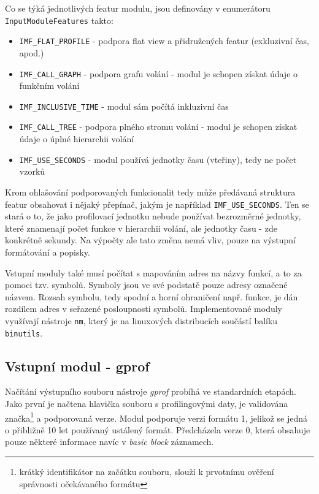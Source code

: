 \documentclass[czech,BP]{thesiskiv}
\begin{document}
Co se týká jednotlivých featur modulu, jsou definovány v enumerátoru \texttt{InputModuleFeatures} takto:

\begin{itemize}
\item \texttt{IMF\_FLAT\_PROFILE} - podpora flat view a přidružených featur (exkluzivní čas, apod.)
\item \texttt{IMF\_CALL\_GRAPH} - podpora grafu volání - modul je schopen získat údaje o funkčním volání
\item \texttt{IMF\_INCLUSIVE\_TIME} - modul sám počítá inkluzivní čas
\item \texttt{IMF\_CALL\_TREE} - podpora plného stromu volání - modul je schopen získat údaje o úplné hierarchii volání
\item \texttt{IMF\_USE\_SECONDS} - modul používá jednotky času (vteřiny), tedy ne počet vzorků
\end{itemize}

Krom ohlašování podporovaných funkcionalit tedy může předávaná struktura featur obsahovat i nějaký přepínač, jakým je například \texttt{IMF\_USE\_SECONDS}. Ten se stará o to, že jako profilovací jednotku nebude používat bezrozměrné jednotky, které znamenají počet  funkce v hierarchii volání, ale jednotky času - zde konkrétně sekundy. Na výpočty ale tato změna nemá vliv, pouze na výstupní formátování a popisky.

Vstupní moduly také musí počítat s mapováním adres na názvy funkcí, a to za pomoci tzv. symbolů. Symboly jsou ve své podstatě pouze adresy označené názvem. Rozsah symbolu, tedy spodní a horní ohraničení např. funkce, je dán rozdílem adres v seřazené posloupnosti symbolů. Implementované moduly využívají nástroje \texttt{nm}, který je na linuxových distribucích součástí balíku \texttt{binutils}.

\subsection{Vstupní modul - gprof}

Načítání výstupního souboru nástroje \emph{gprof} probíhá ve standardních etapách. Jako první je načtena hlavička souboru s profilingovými daty, je validována  značka\footnote{krátký identifikátor na začátku souboru, slouží k prvotnímu ověření správnosti očekávaného formátu} a podporovaná verze. Modul podporuje verzi formátu 1, jelikož se jedná o přibližně 10 let používaný ustálený formát. Předcházela verze 0, která obsahuje pouze některé informace navíc v \emph{basic block} záznamech.
\end{document}
